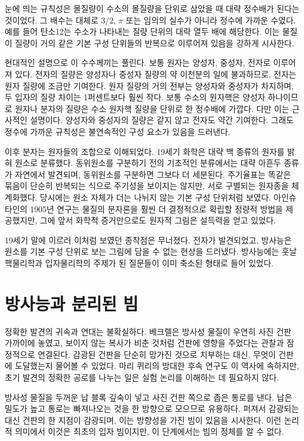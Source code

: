 눈에 띄는 규칙성은 몰질량이 수소의 몰질량을 단위로 삼았을 때 대략 정수배가 된다는 것이었다. 그 배수는 대체로 \(3/2\), \(\pi\) 또는 임의의 실수가 아니라 정수에 가까운 수였다. 예를 들어 탄소12는 수소가 나타내는 질량 단위의 대략 열두 배에 해당한다. 이는 물질이 질량이 거의 같은 기본 구성 단위들의 반복으로 이루어져 있음을 강하게 시사한다.

현대적인 설명으로 이 수수께끼는 풀린다. 보통 원자는 양성자, 중성자, 전자로 이루어져 있다. 전자의 질량은 양성자나 중성자 질량의 약 이천분의 일에 불과하므로, 전자는 원자 질량에 조금만 기여한다. 원자 질량의 거의 전부는 양성자와 중성자가 차지하며, 두 입자의 질량 차이는 1퍼센트보다 훨씬 작다. 보통 수소의 원자핵은 양성자 하나이므로 원자나 분자의 질량은 수소 원자핵 질량을 단위로 한 정수배에 가깝다. 다만 이는 근사적인 설명이다. 양성자와 중성자의 질량은 같지 않고 전자도 약간 기여한다. 그래도 정수에 가까운 규칙성은 불연속적인 구성 요소가 있음을 드러낸다.

이후 분자는 원자들의 조합으로 이해되었다. 19세기 화학은 대략 백 종류의 원자를 밝혀 원소로 분류했다. 동위원소를 구분하기 전의 기초적인 분류에서는 대략 아흔두 종류가 자연에서 발견되며, 동위원소를 구분하면 그보다 더 세분된다. 주기율표는 똑같은 묶음이 단순히 반복되는 식으로 주기성을 보이지는 않지만, 서로 구별되는 원자종을 체계화했다. 당시에는 원소 자체가 더는 나뉘지 않는 기본 구성 단위처럼 보였다. 아인슈타인의 1905년 연구는 물질의 분자론을 훨씬 더 결정적으로 확립할 정량적 방법을 제공했지만, 그에 앞서 화학적 증거만으로도 원자적 그림은 설득력을 얻고 있었다.

19세기 말에 이르러 이처럼 보였던 종착점은 무너졌다. 전자가 발견되었고, 방사능은 원소를 기본 구성 단위로 보는 그림에 담을 수 없는 현상을 드러냈다. 방사능에는 훗날 핵물리학과 입자물리학의 주제가 된 질문들이 이미 축소된 형태로 들어 있었다.

\section{방사능과 분리된 빔}

정확한 발견의 귀속과 연대는 불확실하다. 베크렐은 방사성 물질이 우연히 사진 건판 가까이에 놓였고, 보이지 않는 복사가 비춘 것처럼 건판에 영향을 주었다는 관찰과 잠정적으로 연결된다. 감광된 건판을 단순히 망가진 것으로 치부하는 대신, 무엇이 건판에 도달했는지 물어볼 수 있었다. 마리 퀴리의 방대한 후속 연구도 이 역사에 속하지만, 초기 발견의 정확한 공로를 나누는 일은 실험 논리를 이해하는 데 필요하지 않다.

방사성 물질을 두꺼운 납 블록 깊숙이 넣고 사진 건판 쪽으로 좁은 통로를 낸다. 납은 밀도가 높고 통로는 빠져나오는 것을 한 방향으로 모으므로 유용하다. 퍼져서 감광되는 대신 건판의 한 지점이 감광되며, 이는 방향성을 가진 빔이 있음을 시사한다. 이런 논리적 의미에서 이것은 최초의 입자 빔이지만, 이 단계에서는 빔의 정체를 알 수 없다.

